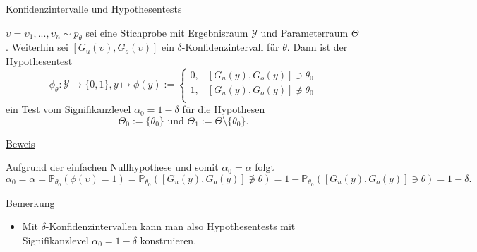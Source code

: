 \documentclass[
  8pt,
  ignorenonframetext,
]{beamer}
\providecommand{\tightlist}{%
  \setlength{\itemsep}{0pt}\setlength{\parskip}{0pt}}
\newcommand{\niton}{\not\owns}
\newcommand{\ups} {\upsilon}
\begin{document}
\begin{frame}{Konfidenzintervalle und Hypothesentests}
\protect\hypertarget{konfidenzintervalle-und-hypothesentests}{}
\small
\begin{theorem}
\justifying
\normalfont
$\ups = \ups_1,...,\ups_n \sim p_\theta$ sei eine Stichprobe mit Ergebnisraum
$\mathcal{Y}$ und Parameterraum $\Theta$. Weiterhin sei $[G_u(\ups), G_o(\ups)]$
ein $\delta$-Konfidenzintervall für $\theta$. Dann ist der Hypothesentest
\begin{equation}
\phi_\theta : \mathcal{Y} \to \{0,1\},
y \mapsto \phi(y)
:=
\begin{cases}
0, & [G_u(y), G_o(y)] \ni    \theta_0 \\
1, & [G_u(y), G_o(y)] \niton \theta_0 \\
\end{cases}
\end{equation}
ein Test vom Signifikanzlevel $\alpha_0 = 1 - \delta$ für die Hypothesen
\begin{equation}
\Theta_0 := \{\theta_0\} \mbox{ und } \Theta_1 := \Theta \setminus \{\theta_0\}.
\end{equation}
\end{theorem}

\footnotesize

\underline{Beweis} \vspace{1mm}

Aufgrund der einfachen Nullhypothese und somit \(\alpha_0 = \alpha\)
folgt \begin{equation}
\alpha_0
= \alpha
= \mathbb{P}_{\theta_0}(\phi(\ups) = 1)
= \mathbb{P}_{\theta_0}([G_u(y), G_o(y)] \niton \theta)
= 1 - \mathbb{P}_{\theta_0}([G_u(y), G_o(y)] \ni \theta)
= 1 - \delta.
\end{equation}

Bemerkung

\begin{itemize}
\tightlist
\item
  Mit \(\delta\)-Konfidenzintervallen kann man also Hypothesentests mit
  Signifikanzlevel \(\alpha_0 = 1-\delta\) konstruieren.
\end{itemize}
\end{frame}
\end{document}
